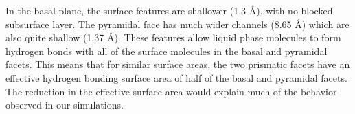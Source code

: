 In the basal plane, the surface features are shallower (1.3 \AA), with
no blocked subsurface layer.  The pyramidal face has much wider
channels (8.65 \AA) which are also quite shallow (1.37 \AA).  These
features allow liquid phase molecules to form hydrogen bonds with all
of the surface molecules in the basal and pyramidal facets.  This
means that for similar surface areas, the two prismatic facets have an
effective hydrogen bonding surface area of half of the basal and
pyramidal facets.  The reduction in the effective surface area would
explain much of the behavior observed in our simulations.




